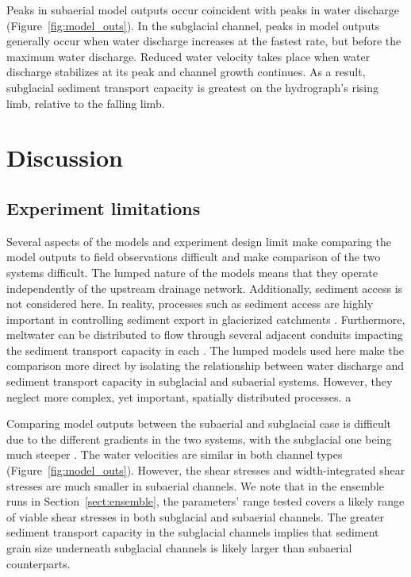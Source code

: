 \documentclass[esurf, manuscript]{copernicus}
\begin{document}
Peaks in subaerial model outputs occur coincident with peaks in water discharge (Figure~\ref{fig:model_outs}).
In the subglacial channel, peaks in model outputs generally occur when water discharge increases at the fastest rate, but before the maximum water discharge.
Reduced water velocity takes place when water discharge stabilizes at its peak and channel growth continues.
As a result, subglacial sediment transport capacity is greatest on the hydrograph's rising limb, relative to the falling limb. 

\FloatBarrier
\section{Discussion}

\subsection{Experiment limitations}

Several aspects of the models and experiment design limit make comparing the model outputs to field observations difficult and make comparison of the two systems difficult.
The lumped nature of the models means that they operate independently of the upstream drainage network.
Additionally, sediment access is not considered here.
In reality, processes such as sediment access are highly important in controlling sediment export in glacierized catchments \citep[e.g.][]{herman2015,vergara2022}.
Furthermore, meltwater can be distributed to flow through several adjacent conduits impacting the sediment transport capacity in each \citep[e.g.][]{werder2013,hewitt2019,delaney2023}.
The lumped models used here make the comparison more direct by isolating the relationship between water discharge and sediment transport capacity in subglacial and subaerial systems. 
However, they neglect more complex, yet important, spatially distributed processes. a

Comparing model outputs between the subaerial and subglacial case is difficult due to the different gradients in the two systems, with the subglacial one being much steeper \citep{alley1997}.
The water velocities are similar in both channel types (Figure~\ref{fig:model_outs}).
However, the shear stresses and width-integrated shear stresses are much smaller in subaerial channels.
We note that in the ensemble runs in Section~\ref{sect:ensemble}, the parameters' range tested covers a likely range of viable shear stresses in both subglacial and subaerial channels.
The greater sediment transport capacity in the subglacial channels implies that sediment grain size underneath subglacial channels is likely larger than subaerial counterparts.
\end{document}
